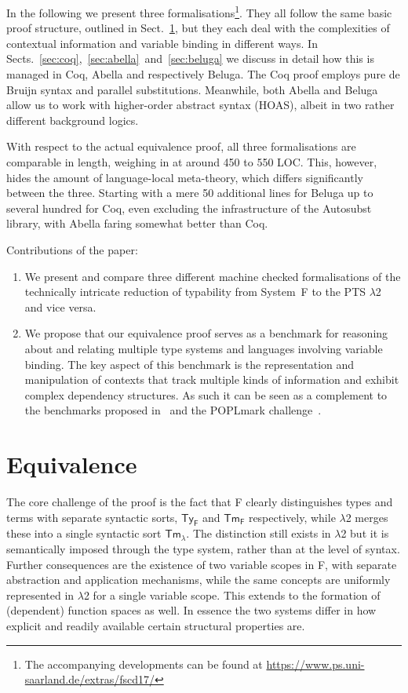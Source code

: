 \documentclass[a4paper,UKenglish]{lipics-v2016}
\newcommand{\SysL}{$\lambda$2\xspace}
\newcommand{\TyF}{\ensuremath{\mathsf{Ty_{F}}}}
\newcommand{\TmF}{\ensuremath{\mathsf{Tm_{F}}}}
\newcommand{\TmL}{\ensuremath{\mathsf{Tm_{\lambda}}}}
\theoremstyle{plain}
\begin{document}
In the following we present three formalisations\footnote{The accompanying developments can be found at \url{https://www.ps.uni-saarland.de/extras/fscd17/}}.
They all follow the same basic proof structure, outlined in Sect.~\ref{sec:equi}, but they each deal with the complexities of contextual information and variable binding in different ways.
In Sects.~\ref{sec:coq},~\ref{sec:abella}~and~\ref{sec:beluga} we discuss in detail how this is managed in Coq, Abella\cite{AbellaTutorial} and respectively Beluga\cite{Pientka:CADE15}.
The Coq proof employs pure de Bruijn syntax and parallel substitutions.
Meanwhile, both Abella and Beluga allow us to work with higher-order abstract syntax (HOAS), albeit in two rather different background logics.

With respect to the actual equivalence proof, all three formalisations are comparable in length, weighing in at around 450 to 550 LOC.
This, however, hides the amount of language-local meta-theory, which differs significantly between the three.
Starting with a mere 50 additional lines for Beluga up to several hundred for Coq, even excluding the infrastructure of the Autosubst library, with Abella faring somewhat better than Coq.

Contributions of the paper:
\begin{enumerate}
\item We present and compare three different machine checked formalisations of the technically intricate reduction of typability from System~F to the PTS \SysL and vice versa.
\item We propose that our equivalence proof serves as a benchmark for reasoning about and relating multiple type systems and languages involving variable binding.
  The key aspect of this benchmark is the representation and manipulation of contexts that track multiple kinds of information and exhibit complex dependency structures.
  As such it can be seen as a complement to the benchmarks proposed in~\cite{Felty:ITP10,Felty:orbi-survey} and the POPLmark challenge~\cite{poplmark}.
\end{enumerate}

\section{Equivalence}
\label{sec:equi}

The core challenge of the proof is the fact that F clearly distinguishes types and terms with separate syntactic sorts, $\TyF$ and $\TmF$ respectively, while \SysL merges these into a single syntactic sort $\TmL$.
The distinction still exists in \SysL but it is semantically imposed through the type system, rather than at the level of syntax.
Further consequences are the existence of two variable scopes in F, with separate abstraction and application mechanisms, while the same concepts are uniformly represented in \SysL for a single variable scope.
This extends to the formation of (dependent) function spaces as well.
In essence the two systems differ in how explicit and readily available certain structural properties are.
\end{document}
